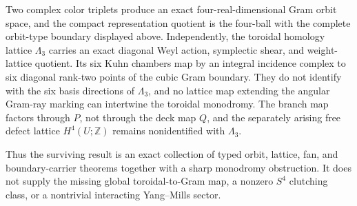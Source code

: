 \documentclass[11pt]{article}
\theoremstyle{definition}
\theoremstyle{remark}
\numberwithin{equation}{section}
\begin{document}
Two complex color triplets produce an exact four-real-dimensional Gram orbit
space, and the compact representation quotient is the four-ball with the
complete orbit-type boundary displayed above.  Independently, the toroidal
homology lattice \(\Lambda_3\) carries an exact diagonal Weyl action,
symplectic shear, and weight-lattice quotient.  Its six Kuhn chambers map by
an integral incidence complex to six diagonal rank-two points of the cubic
Gram boundary.  They do not identify with the six basis directions of
\(\Lambda_3\), and no lattice map extending the angular Gram-ray marking can
intertwine the toroidal monodromy.  The branch map factors through \(P\), not
through the deck map \(Q\), and the separately arising free defect lattice
\(H^4(U;\mathbb Z)\) remains nonidentified with \(\Lambda_3\).

Thus the surviving result is an exact collection of typed orbit, lattice,
fan, and boundary-carrier theorems together with a sharp monodromy
obstruction.  It does not supply the missing global toroidal-to-Gram map, a
nonzero \(S^4\) clutching class, or a nontrivial interacting Yang--Mills
sector.
\end{document}
